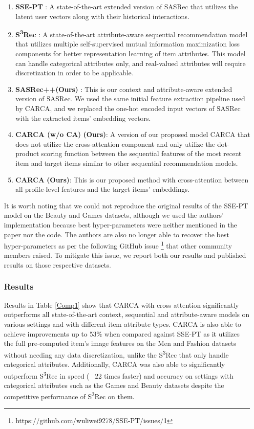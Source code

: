 \documentclass[sigconf,natbib=true]{acmart}
\begin{document}
\begin{enumerate}
 \item \textbf{SSE-PT} \cite{wu2020sse}: A state-of-the-art extended version of SASRec that utilizes the latent user vectors along with their historical interactions. 
 \item \textbf{S\textsuperscript{3}Rec} \cite{ZhouWZZWZWW20}: A state-of-the-art attribute-aware sequential recommendation model that utilizes multiple self-supervised mutual information maximization loss components for better representation learning of item attributes. This model can handle categorical attributes only, and real-valued attributes will require discretization in order to be applicable.
 \item \textbf{SASRec++}\textbf{(Ours)} \cite{kang2018self}: This is our context and attribute-aware extended version of SASRec. We used the same initial feature extraction pipeline used by CARCA, and we replaced the one-hot encoded input vectors of SASRec with the extracted items' embedding vectors.
 
  \item \textbf{CARCA (w/o CA)}\textbf{ (Ours)}: A version of our proposed model CARCA that does not utilize the cross-attention component and only utilize the dot-product scoring function between the sequential features of the most recent item and target items similar to other sequential recommendation models.
  
 \item \textbf{CARCA} \textbf{(Ours)}: This is our proposed method with cross-attention between all profile-level features and the target items' embeddings.
 

\end{enumerate}

It is worth noting that we could not reproduce the original results of the SSE-PT model on the Beauty and Games datasets, although we used the authors' implementation because best hyper-parameters were neither mentioned in the paper nor the code. The authors are also no longer able to recover the best hyper-parameters as per the following GitHub issue \footnote{https://github.com/wuliwei9278/SSE-PT/issues/1} that other community members raised. To mitigate this issue, we report both our results and published results on those respective datasets.

\subsubsection{Results}
Results in Table \ref{Comp1} show that CARCA with cross attention significantly outperforms all state-of-the-art context, sequential and attribute-aware models on various settings and with different item attribute types. CARCA is also able to achieve improvements up to 53\% when compared against SSE-PT as it utilizes the full pre-computed item's image features on the Men and Fashion datasets without needing any data discretization, unlike the S\textsuperscript{3}Rec that only handle categorical attributes. Additionally, CARCA was also able to significantly outperform S\textsuperscript{3}Rec in speed ( ~22 times faster) and accuracy on settings with categorical attributes such as the Games and Beauty datasets despite the competitive performance of S\textsuperscript{3}Rec on them. 
\end{document}
